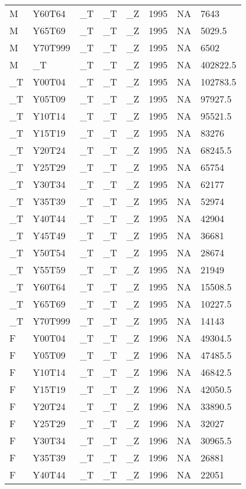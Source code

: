\begin{longtable}[t]{llllllll}
M & Y60T64 & \_T & \_T & \_Z & 1995 & NA & 7643\\
M & Y65T69 & \_T & \_T & \_Z & 1995 & NA & 5029.5\\
\addlinespace
M & Y70T999 & \_T & \_T & \_Z & 1995 & NA & 6502\\
M & \_T & \_T & \_T & \_Z & 1995 & NA & 402822.5\\
\_T & Y00T04 & \_T & \_T & \_Z & 1995 & NA & 102783.5\\
\_T & Y05T09 & \_T & \_T & \_Z & 1995 & NA & 97927.5\\
\_T & Y10T14 & \_T & \_T & \_Z & 1995 & NA & 95521.5\\
\addlinespace
\_T & Y15T19 & \_T & \_T & \_Z & 1995 & NA & 83276\\
\_T & Y20T24 & \_T & \_T & \_Z & 1995 & NA & 68245.5\\
\_T & Y25T29 & \_T & \_T & \_Z & 1995 & NA & 65754\\
\_T & Y30T34 & \_T & \_T & \_Z & 1995 & NA & 62177\\
\_T & Y35T39 & \_T & \_T & \_Z & 1995 & NA & 52974\\
\addlinespace
\_T & Y40T44 & \_T & \_T & \_Z & 1995 & NA & 42904\\
\_T & Y45T49 & \_T & \_T & \_Z & 1995 & NA & 36681\\
\_T & Y50T54 & \_T & \_T & \_Z & 1995 & NA & 28674\\
\_T & Y55T59 & \_T & \_T & \_Z & 1995 & NA & 21949\\
\_T & Y60T64 & \_T & \_T & \_Z & 1995 & NA & 15508.5\\
\addlinespace
\_T & Y65T69 & \_T & \_T & \_Z & 1995 & NA & 10227.5\\
\_T & Y70T999 & \_T & \_T & \_Z & 1995 & NA & 14143\\
F & Y00T04 & \_T & \_T & \_Z & 1996 & NA & 49304.5\\
F & Y05T09 & \_T & \_T & \_Z & 1996 & NA & 47485.5\\
F & Y10T14 & \_T & \_T & \_Z & 1996 & NA & 46842.5\\
\addlinespace
F & Y15T19 & \_T & \_T & \_Z & 1996 & NA & 42050.5\\
F & Y20T24 & \_T & \_T & \_Z & 1996 & NA & 33890.5\\
F & Y25T29 & \_T & \_T & \_Z & 1996 & NA & 32027\\
F & Y30T34 & \_T & \_T & \_Z & 1996 & NA & 30965.5\\
F & Y35T39 & \_T & \_T & \_Z & 1996 & NA & 26881\\
\addlinespace
F & Y40T44 & \_T & \_T & \_Z & 1996 & NA & 22051\\

\end{longtable}
